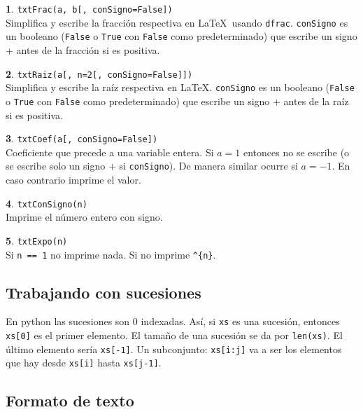 \documentclass[12pt]{article}
\theoremstyle{definition}
\newtheorem{funcion}{}[section]
\begin{document}
\begin{funcion}
  \verb|txtFrac(a, b[, conSigno=False])| \\[1ex]
  Simplifica y escribe la fracci\'on respectiva en \LaTeX\ usando \verb|dfrac|. \verb|conSigno| es un booleano (\verb|False| o \verb|True| con \verb|False| como predeterminado) que escribe un signo + antes de la fracci\'on si es positiva.
\end{funcion}

\begin{funcion}
  \verb|txtRaiz(a[, n=2[, conSigno=False]])| \\[1ex]
  Simplifica y escribe la ra\'iz respectiva en \LaTeX. \verb|conSigno| es un booleano (\verb|False| o \verb|True| con \verb|False| como predeterminado) que escribe un signo + antes de la ra\'iz si es positiva.
\end{funcion}

\begin{funcion}
  \verb|txtCoef(a[, conSigno=False])| \\[1ex]
  Coeficiente que precede a una variable entera. Si $a=1$ entonces no se escribe (o se escribe solo un signo + si \verb|conSigno|). De manera similar ocurre si $a=-1$. En caso contrario imprime el valor.
\end{funcion}

\begin{funcion}
  \verb|txtConSigno(n)| \\[1ex]
  Imprime el n\'umero entero con signo.
\end{funcion}

\begin{funcion}
  \verb|txtExpo(n)| \\[1ex]
  Si \verb|n == 1| no imprime nada. Si no imprime \verb|^{n}|.
\end{funcion}

\subsection{Trabajando con sucesiones}

En python las sucesiones son 0 indexadas. As\'i, si \verb|xs| es una sucesi\'on, entonces \verb|xs[0]| es el primer elemento. El tama\~no de una sucesi\'on se da por \verb|len(xs)|. El \'ultimo elemento ser\'ia \verb|xs[-1]|. Un subconjunto: \verb|xs[i:j]| va a ser los elementos que hay desde \verb|xs[i]| hasta \verb|xs[j-1]|.

\subsection{Formato de texto}
\end{document}
